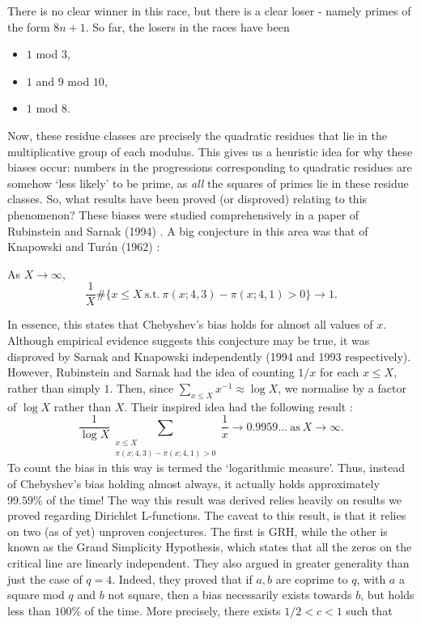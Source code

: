 There is no clear winner in this race, but there is a clear loser - namely primes of the form $8n + 1$. So far, the losers in the races have been
\begin{itemize}
    \item $1$ mod $3$,
    \item $1$ and $9$ mod $10$,
    \item $1$ mod $8$.
\end{itemize}
Now, these residue classes are precisely the quadratic residues that lie in the multiplicative group of each modulus. This gives us a heuristic idea for why these biases occur: numbers in the progressions corresponding to quadratic residues are somehow `less likely' to be prime, as \textit{all} the squares of primes lie in these residue classes. So, what results have been proved (or disproved) relating to this phenomenon? These biases were studied comprehensively in a paper of Rubinstein and Sarnak (1994) \cite{Rubinstein1994ChebyshevsB}. A big conjecture in this area was that of Knapowski and Turán (1962) \cite[p.~3]{granville2004prime}:
\begin{conjecture}
As $X \rightarrow \infty$, 
\begin{equation}
    \frac{1}{X} \#\{x \leq X \ \textrm{s.t.} \ \pi(x; 4, 3) - \pi(x; 4, 1) > 0 \} \rightarrow 1. \nonumber
\end{equation}
\end{conjecture}
In essence, this states that Chebyshev's bias holds for almost all values of $x$. Although empirical evidence suggests this conjecture may be true, it was disproved by Sarnak and Knapowski independently (1994 and 1993 respectively). However, Rubinstein and Sarnak had the idea of counting $1/x$ for each $x \leq X$, rather than simply $1$. Then, since $\sum_{x \leq X} x^{-1} \approx \log X$, we normalise by a factor of $\log X$ rather than $X$. Their inspired idea had the following result \cite[p.~18]{granville2004prime}:
\begin{equation}
    \frac{1}{\log X} \sum_{\substack{x \leq X \\ \pi(x; 4, 3) - \pi(x; 4, 1) > 0}} \frac{1}{x} \rightarrow 0.9959\dots \ \textrm{as} \ X \rightarrow \infty. \nonumber
\end{equation}
To count the bias in this way is termed the `logarithmic measure'. Thus, instead of Chebyshev's bias holding almost always, it actually holds approximately $99.59\%$ of the time! The way this result was derived relies heavily on results we proved regarding Dirichlet L-functions. The caveat to this result, is that it relies on two (as of yet) unproven conjectures. The first is GRH, while the other is known as the Grand Simplicity Hypothesis, which states that all the zeros on the critical line are linearly independent. They also argued in greater generality than just the case of $q = 4$. Indeed, they proved that if $a, b$ are coprime to $q$, with $a$ a square mod $q$ and $b$ not square, then a bias necessarily exists towards $b$, but holds less than $100\%$ of the time. More precisely, there exists $1/2 < c < 1$ such that

